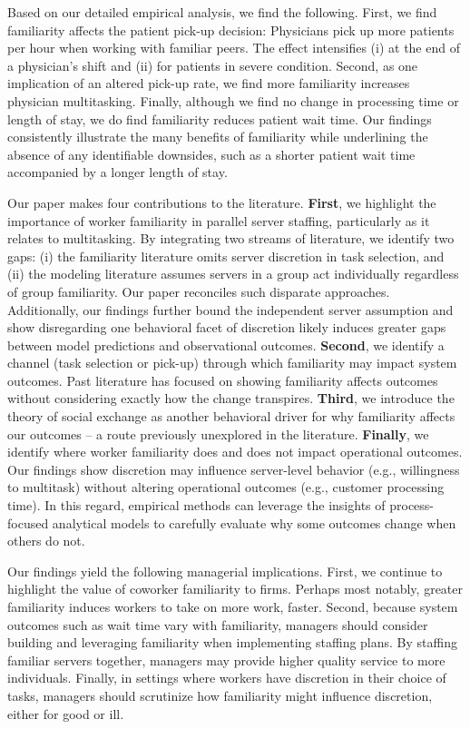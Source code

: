  Based on our detailed empirical analysis, we find the following. First, we find familiarity affects the patient pick-up decision: Physicians pick up more patients per hour when working with familiar peers. The effect intensifies (i) at the end of a physician's shift and (ii) for patients in severe condition. Second, as one implication of an altered pick-up rate, we find more familiarity increases physician multitasking. Finally, although we find no change in processing time or length of stay, we do find familiarity reduces patient wait time. Our findings consistently illustrate the many benefits of familiarity while underlining the absence of any identifiable downsides, such as a shorter patient wait time accompanied by a longer length of stay.
 
 Our paper makes four contributions to the literature. \textbf{First}, we highlight the importance of worker familiarity in parallel server staffing, particularly as it relates to multitasking. By integrating two streams of literature, we identify two gaps: (i) the familiarity literature omits server discretion in task selection, and (ii) the modeling literature assumes servers in a group act individually regardless of group familiarity. Our paper reconciles such disparate approaches. Additionally, our findings further bound the independent server assumption and show disregarding one behavioral facet of discretion likely induces greater gaps between model predictions and observational outcomes. \textbf{Second}, we identify a channel (task selection or pick-up) through which familiarity may impact system outcomes. Past literature has focused on showing familiarity affects outcomes without considering exactly how the change transpires. \textbf{Third}, we introduce the theory of social exchange as another behavioral driver for why familiarity affects our outcomes -- a route previously unexplored in the literature. \textbf{Finally}, we identify where worker familiarity does and does not impact operational outcomes. Our findings show discretion may influence server-level behavior (e.g., willingness to multitask) without altering operational outcomes (e.g., customer processing time). In this regard, empirical methods can leverage the insights of process-focused analytical models to carefully evaluate why some outcomes change when others do not. 
 
 Our findings yield the following managerial implications. First, we continue to highlight the value of coworker familiarity to firms. Perhaps most notably, greater familiarity induces workers to take on more work, faster. Second, because system outcomes such as wait time vary with familiarity, managers should consider building and leveraging familiarity when implementing staffing plans. By staffing familiar servers together, managers may provide higher quality service to more individuals. Finally, in settings where workers have discretion in their choice of tasks, managers should scrutinize how familiarity might influence discretion, either for good or ill.
 
